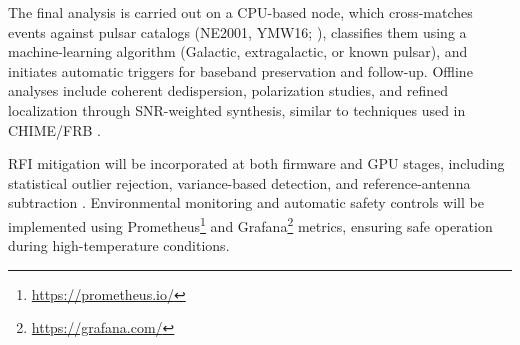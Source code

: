 The final analysis is carried out on a CPU-based node, which cross-matches events against pulsar catalogs (NE2001, YMW16; \citealt{cordes2003ne2001inewmodelgalactic, Yao2017}), classifies them using a machine-learning algorithm (Galactic, extragalactic, or known pulsar), and initiates automatic triggers for baseband preservation and follow-up. Offline analyses include coherent dedispersion, polarization studies, and refined localization through SNR-weighted synthesis, similar to techniques used in CHIME/FRB \citep{Michilli_2021,CHIMEcatalog2021}.

RFI mitigation will be incorporated at both firmware and GPU stages, including statistical outlier rejection, variance-based detection, and reference-antenna subtraction \citep{taylor2019spectralkurtosisbasedrfimitationchime, Li_2025}. Environmental monitoring and automatic safety controls will be implemented using Prometheus\footnote{\url{https://prometheus.io/}} and Grafana\footnote{\url{https://grafana.com/}} metrics, ensuring safe operation during high-temperature conditions.


